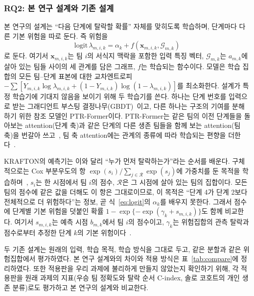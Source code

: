 \subsubsection{RQ2: 본 연구 설계와 기존 설계}
\label{sec:method:rq2}
본 연구의 설계는 “다음 단계에 탈락할 확률” 자체를 맞히도록 학습하며, 단계마다 다른 기본 위험을 따로 둔다.
즉 위험을
\begin{equation}
\mathrm{logit}\,\lambda_{m,i,k}=\alpha_k+f(\mathbf{x}_{m,i,k},\mathcal{G}_{m,k})
\label{eq:logit}
\end{equation}
로 둔다. 여기서 $\mathbf{x}_{m,i,k}$는 팀 $i$의 서식지 맥락을 포함한 입력 특징 벡터, $\mathcal{G}_{m,k}$는 $a_{m,k}$에 살아 있는 팀들 사이의 세 관계를 담은 그래프, $f$는 학습되는 함수이다.
모델은 학습 집합의 모든 팀--단계 표본에 대한 교차엔트로피 $-\sum[Y_{m,i,k}\log\lambda_{m,i,k}+(1-Y_{m,i,k})\log(1-\lambda_{m,i,k})]$를 최소화한다.
설계가 특정 학습기에 기대지 않음을 보이기 위해 두 학습기를 쓴다.
하나는 단계 번호를 입력으로 받는 그래디언트 부스팅 결정나무(GBDT)~\cite{Friedman01}이고, 다른 하나는 구조의 기여를 분해하기 위한 참조 모델인 PTR-Former이다.
PTR-Former는 같은 팀의 이전 단계들을 돌아보는 attention(단계 축)과 같은 단계의 다른 생존 팀들을 함께 보는 attention(팀 축)을 번갈아 쓰고~\cite{Vaswani17}, 팀 축 attention에는 관계의 종류에 따라 학습되는 편향을 더한다~\cite{Ying21}.

KRAFTON의 예측기는 이와 달리 “누가 먼저 탈락하는가”라는 순서를 배운다.
구체적으로는 Cox 부분우도의 항 $\exp(s_i)/\sum_{j\in\mathcal{R}}\exp(s_j)$에 가중치를 둔 목적을 학습하며~\cite{Cox72}, $s_i$는 한 시점에서 팀 $i$의 점수, $\mathcal{R}$은 그 시점에 살아 있는 팀의 집합이다.
모든 팀의 점수에 같은 값을 더해도 이 항은 그대로이므로, 이 목적은 “단계 4가 단계 2보다 전체적으로 더 위험하다”는 정보, 곧 식~\eqref{eq:logit}의 $\alpha_k$를 배우지 못한다.
그래서 점수에 단계별 기본 위험을 덧붙인 확률 $1-\exp\{-\exp(\gamma_k+s_{m,i,k})\}$도 함께 비교한다. 여기서 $s_{m,i,k}$는 예측 시점 $b_{m,k}$에서 팀 $i$의 점수이고, $\gamma_k$는 위험집합의 관측 탈락과 점수로부터 추정한 단계 $k$의 기본 위험이다~\cite{PrenticeGloeckler78}.

두 기존 설계는 원래의 입력, 학습 목적, 학습 방식을 그대로 두고, 같은 분할과 같은 위험집합에서 평가하였다. 본 연구 설계와의 차이와 적용 방식은 표~\ref{tab:compare}에 정리하였다.
또한 적용판을 우리 과제에 불리하게 만들지 않았는지 확인하기 위해, 각 적용판을 원래 과제의 지표(우승 팀 정확도와 탈락 순서 C-index, 솔로 코호트의 개인 생존 분류)로도 평가하고 본 연구의 설계와 비교한다.


